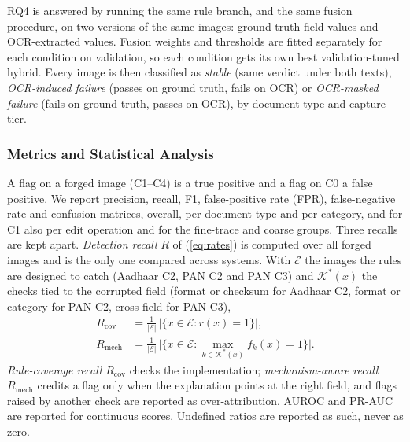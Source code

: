 \documentclass[12pt]{article}
\begin{document}
RQ4 is answered by running the same rule branch, and the same fusion
procedure, on two versions of the same images: ground-truth field
values and OCR-extracted values. Fusion weights and thresholds are
fitted separately for each condition on validation, so each condition
gets its own best validation-tuned hybrid. Every image is then
classified as \emph{stable} (same verdict under both texts),
\emph{OCR-induced failure} (passes on ground truth, fails on OCR) or
\emph{OCR-masked failure} (fails on ground truth, passes on OCR), by
document type and capture tier.

\subsubsection{Metrics and Statistical Analysis}
\label{sec:metrics}

A flag on a forged image (C1--C4) is a true positive and a flag on C0 a
false positive. We report precision, recall, F1, false-positive rate
(FPR), false-negative rate and confusion matrices, overall, per document
type and per category, and for C1 also per edit operation and for the
fine-trace and coarse groups. Three recalls are kept apart.
\emph{Detection recall} $R$ of (\ref{eq:rates}) is computed over all
forged images and is the only one compared across systems. With
$\mathcal{E}$ the images the rules are designed to catch (Aadhaar C2,
PAN C2 and PAN C3) and $\mathcal{K}^{\ast}(x)$ the checks tied to the
corrupted field (format or checksum for Aadhaar C2, format or category
for PAN C2, cross-field for PAN C3),
\begin{equation}
\label{eq:recalls}
\begin{aligned}
R_{\mathrm{cov}}&=\frac{1}{|\mathcal{E}|}\,\big|\{x\in\mathcal{E}: r(x)=1\}\big|,\\
R_{\mathrm{mech}}&=\frac{1}{|\mathcal{E}|}\,\big|\{x\in\mathcal{E}: \textstyle\max_{k\in\mathcal{K}^{\ast}(x)} f_k(x)=1\}\big|.
\end{aligned}
\end{equation}
\emph{Rule-coverage recall} $R_{\mathrm{cov}}$ checks the implementation;
\emph{mechanism-aware recall} $R_{\mathrm{mech}}$ credits a flag only
when the explanation points at the right field, and flags raised by
another check are reported as over-attribution. AUROC and PR-AUC are
reported for continuous scores. Undefined ratios are reported as such,
never as zero.
\end{document}
